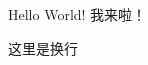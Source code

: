 \documentclass{article}
\begin{document}
\begin{CJK*}{UTF8}{gbsn}
Hello World! 我来啦！%


这里是换行
\clearpage\end{CJK*}
\end{document}
